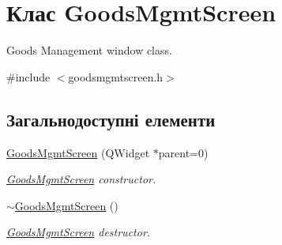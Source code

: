 \hypertarget{classGoodsMgmtScreen}{\section{Клас Goods\-Mgmt\-Screen}
\label{classGoodsMgmtScreen}
}


Goods Management window class.  




{\ttfamily \#include $<$goodsmgmtscreen.\-h$>$}

\subsection*{Загальнодоступні елементи}
\begin{DoxyCompactItemize}
\item 
\hyperlink{classGoodsMgmtScreen_a23df1d60103959e1b6fc32852aec9873}{Goods\-Mgmt\-Screen} (Q\-Widget $\ast$parent=0)
\begin{DoxyCompactList}\small\item\em \hyperlink{classGoodsMgmtScreen}{Goods\-Mgmt\-Screen} constructor. \end{DoxyCompactList}\item 
\hypertarget{classGoodsMgmtScreen_a0ab5666478d7b8fa00843aa127ce2a3b}{\hyperlink{classGoodsMgmtScreen_a0ab5666478d7b8fa00843aa127ce2a3b}{$\sim$\-Goods\-Mgmt\-Screen} ()}\label{classGoodsMgmtScreen_a0ab5666478d7b8fa00843aa127ce2a3b}

\begin{DoxyCompactList}\small\item\em \hyperlink{classGoodsMgmtScreen}{Goods\-Mgmt\-Screen} destructor. \end{DoxyCompactList}\end{DoxyCompactItemize}
